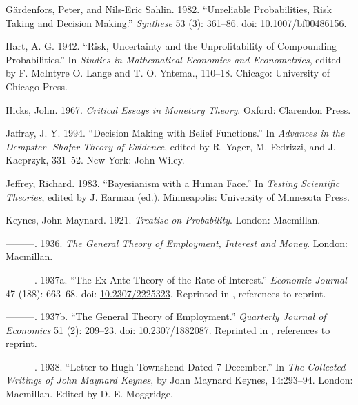 \documentclass[
  10pt,
  letterpaper,
  DIV=11,
  numbers=noendperiod,
  twoside]{scrartcl}
\newlength{\cslhangindent}
\newenvironment{CSLReferences}[2] %
 {\begin{list}{}{%
  \setlength{\itemindent}{0pt}
  \setlength{\leftmargin}{0pt}
  \setlength{\parsep}{0pt}
  \ifodd #1
   \setlength{\leftmargin}{\cslhangindent}
   \setlength{\itemindent}{-1\cslhangindent}
  \fi
  \setlength{\itemsep}{#2\baselineskip}}}
 {\end{list}}
\begin{document}
\begin{CSLReferences}{1}{0}
Gärdenfors, Peter, and Nils-Eric Sahlin. 1982. {``Unreliable
Probabilities, Risk Taking and Decision Making.''} \emph{Synthese} 53
(3): 361--86. doi:
\href{https://doi.org/10.1007/bf00486156}{10.1007/bf00486156}.

Hart, A. G. 1942. {``Risk, Uncertainty and the Unprofitability of
Compounding Probabilities.''} In \emph{Studies in Mathematical Economics
and Econometrics}, edited by F. McIntyre O. Lange and T. O. Yntema.,
110--18. Chicago: University of Chicago Press.

Hicks, John. 1967. \emph{Critical Essays in Monetary Theory}. Oxford:
Clarendon Press.

Jaffray, J. Y. 1994. {``Decision Making with Belief Functions.''} In
\emph{Advances in the Dempster- Shafer Theory of Evidence}, edited by R.
Yager, M. Fedrizzi, and J. Kacprzyk, 331--52. New York: John Wiley.

Jeffrey, Richard. 1983. {``Bayesianism with a Human Face.''} In
\emph{Testing Scientific Theories}, edited by J. Earman (ed.).
Minneapolis: University of Minnesota Press.

Keynes, John Maynard. 1921. \emph{Treatise on Probability}. London:
Macmillan.

---------. 1936. \emph{The General Theory of Employment, Interest and
Money}. London: Macmillan.

---------. 1937a. {``The Ex Ante Theory of the Rate of Interest.''}
\emph{Economic Journal} 47 (188): 663--68. doi:
\href{https://doi.org/10.2307/2225323}{10.2307/2225323}. Reprinted in
\cite[XIV 215-223]{KeynesCW}, references to reprint.

---------. 1937b. {``The General Theory of Employment.''}
\emph{Quarterly Journal of Economics} 51 (2): 209--23. doi:
\href{https://doi.org/10.2307/1882087}{10.2307/1882087}. Reprinted in
\cite[XIV 109-123]{KeynesCW}, references to reprint.

---------. 1938. {``Letter to Hugh Townshend Dated 7 December.''} In
\emph{The Collected Writings of John Maynard Keynes}, by John Maynard
Keynes, 14:293--94. London: Macmillan. Edited by D. E. Moggridge.


\end{CSLReferences}
\end{document}
